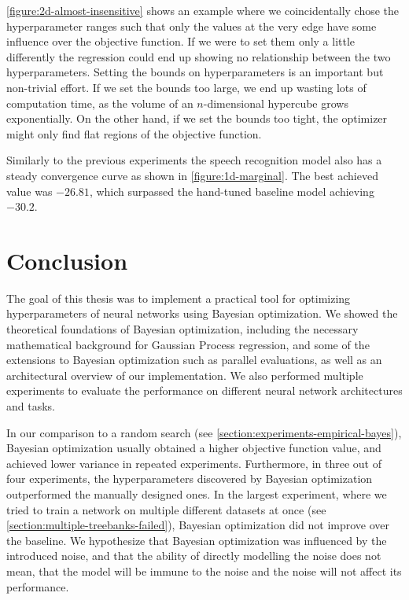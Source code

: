 \autoref{figure:2d-almost-insensitive} shows an example where we coincidentally chose the hyperparameter ranges such that only the values at the very edge have some influence over the objective function. If we were to set them only a little differently the regression could end up showing no relationship between the two hyperparameters. Setting the bounds on hyperparameters is an important but non-trivial effort. If we set the bounds too large, we end up wasting lots of computation time, as the volume of an $n$-dimensional hypercube grows exponentially. On the other hand, if we set the bounds too tight, the optimizer might only find flat regions of the objective function.

Similarly to the previous experiments the speech recognition model also has a steady convergence curve as shown in \autoref{figure:1d-marginal}. The best achieved value was $-26.81$, which surpassed the hand-tuned baseline model achieving $-30.2$.


\chapter{Conclusion}

The goal of this thesis was to implement a practical tool for optimizing hyperparameters of neural networks using Bayesian optimization. We showed the theoretical foundations of Bayesian optimization, including the necessary mathematical background for Gaussian Process regression, and some of the extensions to Bayesian optimization such as parallel evaluations, as well as an architectural overview of our implementation. We also performed multiple experiments to evaluate the performance on different neural network architectures and tasks.

In our comparison to a random search (see \autoref{section:experiments-empirical-bayes}), Bayesian optimization usually obtained a higher objective function value, and achieved lower variance in repeated experiments. Furthermore, in three out of four experiments, the hyperparameters discovered by Bayesian optimization outperformed the manually designed ones. In the largest experiment, where we tried to train a network on multiple different datasets at once (see \autoref{section:multiple-treebanks-failed}), Bayesian optimization did not improve over the baseline. We hypothesize that Bayesian optimization was influenced by the introduced noise, and that the ability of directly modelling the noise does not mean, that the model will be immune to the noise and the noise will not affect its performance.

